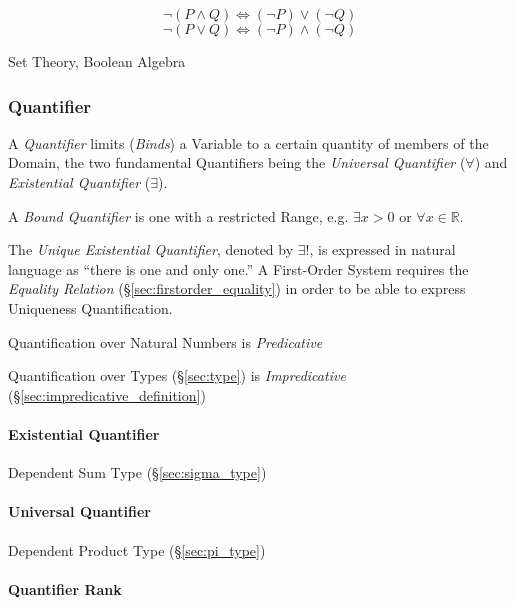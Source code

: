 \[
  \neg (P \wedge Q) \Leftrightarrow (\neg P) \vee (\neg Q)
\] \[
  \neg (P \vee Q) \Leftrightarrow (\neg P) \wedge (\neg Q)
\]

Set Theory, Boolean Algebra



\subsubsection{Quantifier}\label{sec:quantifier}

A \emph{Quantifier} limits (\emph{Binds}) a Variable to a certain
quantity of members of the Domain, the two fundamental Quantifiers
being the \emph{Universal Quantifier} ($\forall$) and
\emph{Existential Quantifier} ($\exists$).

A \emph{Bound Quantifier} is one with a restricted Range, e.g.
$\exists x > 0$ or $\forall x \in \mathbb{R}$.

The \emph{Unique Existential Quantifier}, denoted by $\exists !$, is
expressed in natural language as ``there is one and only one.'' A
First-Order System requires the \emph{Equality Relation}
(\S\ref{sec:firstorder_equality}) in order to be able to express
Uniqueness Quantification.

Quantification over Natural Numbers is \emph{Predicative}

Quantification over Types (\S\ref{sec:type}) is \emph{Impredicative}
(\S\ref{sec:impredicative_definition})



\paragraph{Existential Quantifier}\label{sec:existential_quantifier}\hfill

Dependent Sum Type (\S\ref{sec:sigma_type})



\paragraph{Universal Quantifier}\label{sec:universal_quantifier}\hfill

Dependent Product Type (\S\ref{sec:pi_type})



\paragraph{Quantifier Rank}\label{sec:quantifier_rank}\hfill

